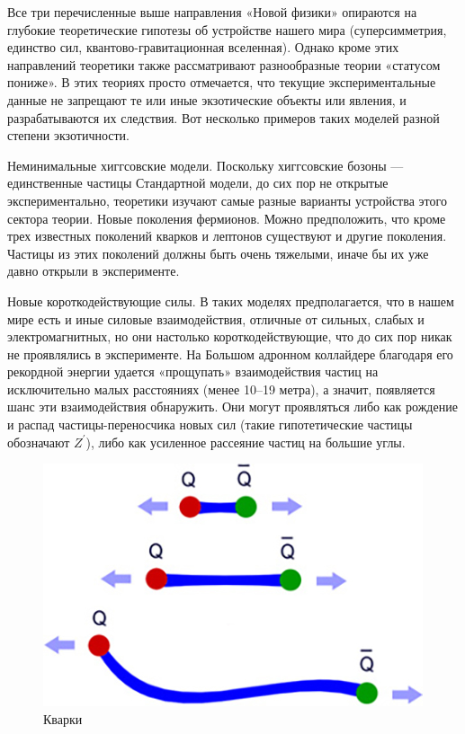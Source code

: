 Все три перечисленные выше направления «Новой физики» опираются на глубокие теоретические гипотезы об устройстве нашего мира (суперсимметрия, единство сил, квантово-гравитационная вселенная). Однако кроме этих направлений теоретики также рассматривают разнообразные теории «статусом пониже». В этих теориях просто отмечается, что текущие экспериментальные данные не запрещают те или иные экзотические объекты или явления, и разрабатываются их следствия. Вот несколько примеров таких моделей разной степени экзотичности.

Неминимальные хиггсовские модели. Поскольку хиггсовские бозоны — единственные частицы Стандартной модели, до сих пор не открытые экспериментально, теоретики изучают самые разные варианты устройства этого сектора теории.
Новые поколения фермионов. Можно предположить, что кроме трех известных поколений кварков и лептонов существуют и другие поколения. Частицы из этих поколений должны быть очень тяжелыми, иначе бы их уже давно открыли в эксперименте.

Новые короткодействующие силы. В таких моделях предполагается, что в нашем мире есть и иные силовые взаимодействия, отличные от сильных, слабых и электромагнитных, но они настолько короткодействующие, что до сих пор никак не проявлялись в эксперименте. На Большом адронном коллайдере благодаря его рекордной энергии удается «прощупать» взаимодействия частиц на исключительно малых расстояниях (менее 10–19 метра), а значит, появляется шанс эти взаимодействия обнаружить. Они могут проявляться либо как рождение и распад частицы-переносчика новых сил (такие гипотетические частицы обозначают $Z^\prime$), либо как усиленное рассеяние частиц на большие углы.

\begin{figure}[h]
	\centering
	\includegraphics[width=\textwidth]{figures/quirk-antiquirk.jpg}
	\caption{Кварки}
	\label{fig:fig03}
\end{figure}

